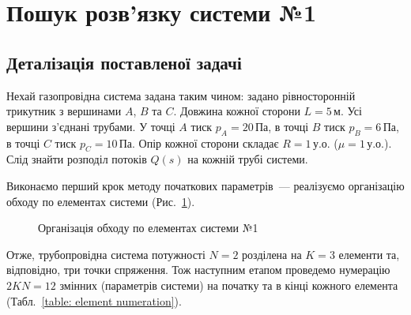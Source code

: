 \documentclass{mathreport}
\begin{document}
\section{Пошук розв'язку системи №1}

\subsection*{Деталізація поставленої задачі}

Нехай газопровідна система задана таким чином: задано рівносторонній трикутник з вершинами $A$, $B$ та $C$. Довжина кожної сторони $L=5\,\text{м}$. Усі вершини з'єднані трубами. У точці $A$ тиск $p_A = 20\,\text{Па}$, в точці $B$ тиск $p_B = 6\,\text{Па}$, в точці $C$ тиск $p_C = 10\,\text{Па}$. Опір кожної сторони складає $R = 1\,\text{у.о.}$ ($\mu = 1\,\text{у.о.}$). Слід знайти розподіл потоків $Q(s)$ на кожній трубі системи. 

Виконаємо перший крок методу початкових параметрів~--- реалізуємо організацію обходу по елементах системи (Рис.~\ref{pic: ABC triangle}).

\vspace{0.4cm}
\begin{figure}[H]\centering
    
    \caption{Організація обходу по елементах системи №1}
    \label{pic: ABC triangle}
\end{figure}

Отже, трубопровідна система потужності $N=2$ розділена на $K=3$ елементи та, відповідно, три точки спряження. Тож наступним етапом проведемо нумерацію $2KN=12$ змінних (параметрів системи) на початку та в кінці кожного елемента (Табл.~\ref{table: element numeration}).
\end{document}
